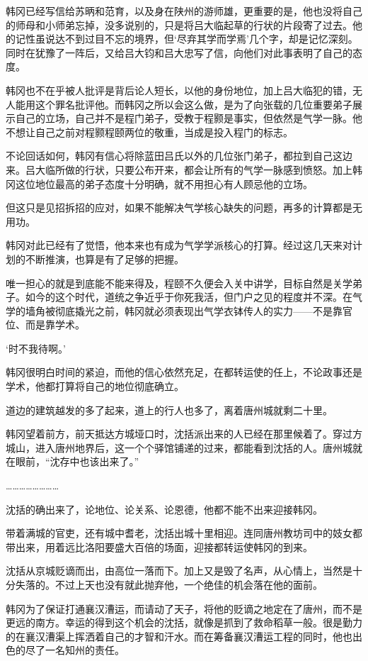 韩冈已经写信给苏昞和范育，以及身在陕州的游师雄，更重要的是，他也没将自己的师母和小师弟忘掉，没多说别的，只是将吕大临起草的行状的片段寄了过去。他的记性虽说达不到过目不忘的境界，但‘尽弃其学而学焉’几个字，却是记忆深刻。同时在犹豫了一阵后，又给吕大钧和吕大忠写了信，向他们对此事表明了自己的态度。

韩冈也不在乎被人批评是背后论人短长，以他的身份地位，加上吕大临犯的错，无人能用这个罪名批评他。而韩冈之所以会这么做，是为了向张载的几位重要弟子展示自己的立场，自己并不是程门弟子，受教于程颢是事实，但依然是气学一脉。他不想让自己之前对程颢程颐两位的敬重，当成是投入程门的标志。

不论回话如何，韩冈有信心将除蓝田吕氏以外的几位张门弟子，都拉到自己这边来。吕大临所做的行状，只要公布开来，都会让所有的气学一脉感到愤怒。加上韩冈这位地位最高的弟子态度十分明确，就不用担心有人顾忌他的立场。

但这只是见招拆招的应对，如果不能解决气学核心缺失的问题，再多的计算都是无用功。

韩冈对此已经有了觉悟，他本来也有成为气学学派核心的打算。经过这几天来对计划的不断推演，也算是有了足够的把握。

唯一担心的就是到底能不能来得及，程颐不久便会入关中讲学，目标自然是关学弟子。如今的这个时代，道统之争近乎于你死我活，但门户之见的程度并不深。在气学的墙角被彻底撬光之前，韩冈就必须表现出气学衣钵传人的实力——不是靠官位、而是靠学术。

‘时不我待啊。’

韩冈很明白时间的紧迫，而他的信心依然充足，在都转运使的任上，不论政事还是学术，他都打算将自己的地位彻底确立。

道边的建筑越发的多了起来，道上的行人也多了，离着唐州城就剩二十里。

韩冈望着前方，前天抵达方城垭口时，沈括派出来的人已经在那里候着了。穿过方城山，进入唐州地界后，这一个个驿馆铺递的过来，都能看到沈括的人。唐州城就在眼前，“沈存中也该出来了。”

……………………

沈括的确出来了，论地位、论关系、论恩德，他都不能不出来迎接韩冈。

带着满城的官吏，还有城中耆老，沈括出城十里相迎。连同唐州教坊司中的妓女都带出来，用着远比洛阳要盛大百倍的场面，迎接都转运使韩冈的到来。

沈括从京城贬谪而出，由高位一落而下。加上又是毁了名声，从心情上，当然是十分失落的。不过上天也没有就此抛弃他，一个绝佳的机会落在他的面前。

韩冈为了保证打通襄汉漕运，而请动了天子，将他的贬谪之地定在了唐州，而不是更远的南方。幸运的得到这个机会的沈括，就像是抓到了救命稻草一般。很是勤力的在襄汉漕渠上挥洒着自己的才智和汗水。而在筹备襄汉漕运工程的同时，他也出色的尽了一名知州的责任。

